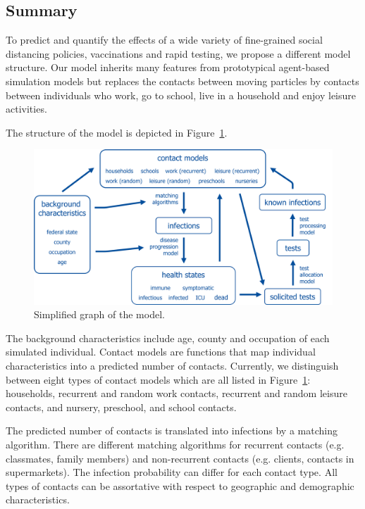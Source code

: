 \subsection{Summary}
\label{sub:model_summary}

To predict and quantify the effects of a wide variety of fine-grained social distancing policies, vaccinations and rapid testing, we propose a different model structure. Our
model inherits many features from prototypical agent-based simulation models but
replaces the contacts between moving particles by contacts between individuals who work,
go to school, live in a household and enjoy leisure activities.

The structure of the model is depicted in Figure~\ref{fig:model_graph}.

\begin{figure}[!tp]
    \centering
    \includegraphics[width=\textwidth]{../figures/model_detailed.png}
    \caption{Simplified graph of the model.}
    \label{fig:model_graph}
\end{figure}

The background characteristics include age, county and occupation of each simulated
individual. Contact models are functions that map individual characteristics into a
predicted number of contacts. Currently, we distinguish between eight types of contact
models which are all listed in Figure~\ref{fig:model_graph}: households, recurrent and
random work contacts, recurrent and random leisure contacts, and nursery, preschool, and
school contacts.

The predicted number of contacts is translated into infections by a matching algorithm.
There are different matching algorithms for recurrent contacts (e.g. classmates, family
members) and non-recurrent contacts (e.g. clients, contacts in supermarkets). The
infection probability can differ for each contact type. All types of contacts can be
assortative with respect to geographic and demographic characteristics.

